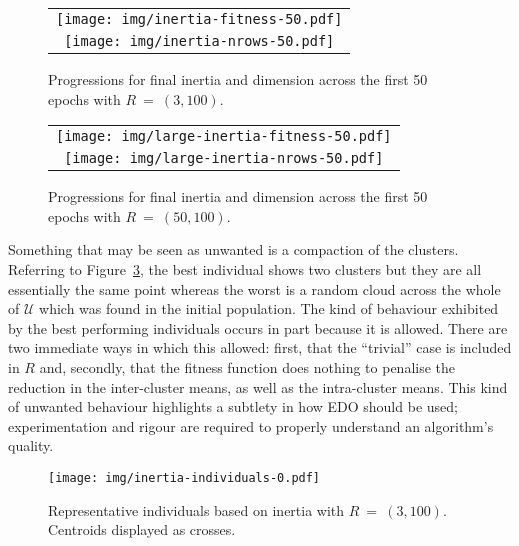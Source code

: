 \begin{figure}[htbp]
    \ContinuedFloat*
    \centering
    \begin{tabular}{c}
        \texttt{[image: img/inertia-fitness-50.pdf]}\\
        \texttt{[image: img/inertia-nrows-50.pdf]}
    \end{tabular}
    \caption{%
        \label{figure:inertia-50}
        Progressions for final inertia and dimension across the first 50
        epochs with \(R~=~(3,100)\).
    }
\end{figure}

\begin{figure}[htbp]
    \ContinuedFloat%
    \centering
    \begin{tabular}{c}
        \texttt{[image: img/large-inertia-fitness-50.pdf]}\\
        \texttt{[image: img/large-inertia-nrows-50.pdf]}
    \end{tabular}
    \caption{%
        \label{figure:large-inertia-50}
        Progressions for final inertia and dimension across the first 50 epochs
        with \(R~=~(50,100)\).
    }
\end{figure}

Something that may be seen as unwanted is a compaction of the clusters.
Referring to Figure~\ref{figure:inertia-individuals}, the best individual shows
two clusters but they are all essentially the same point whereas the worst is a
random cloud across the whole of \(\mathcal{U}\) which was found in the
initial population. The kind of behaviour exhibited by the best performing
individuals occurs in part because it is allowed. There are two immediate ways
in which this allowed: first, that the ``trivial'' case is included in \(R\)
and, secondly, that the fitness function does nothing to penalise the reduction
in the inter-cluster means, as well as the intra-cluster means. This kind of
unwanted behaviour highlights a subtlety in how EDO should be used;
experimentation and rigour are required to properly understand an algorithm's
quality.

\begin{figure}[htbp]
    \ContinuedFloat*
    \centering
    \texttt{[image: img/inertia-individuals-0.pdf]}
    \caption{%
        \label{figure:inertia-individuals}
        Representative individuals based on inertia with \(R~=~(3,100)\).
        Centroids displayed as crosses.
    }
\end{figure}

